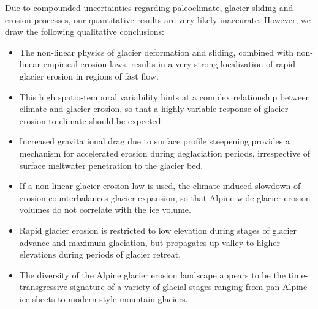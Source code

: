 \documentclass[esurf, manuscript]{copernicus}
\begin{document}
    Due to compounded uncertainties regarding paleoclimate, glacier sliding and
    erosion processes, our quantitative results are very likely inaccurate.
    However, we draw the following qualitative conclusions:
    \begin{itemize}
      \item The non-linear physics of glacier deformation and sliding, combined
        with non-linear empirical erosion laws, results in a very strong
        localization of rapid glacier erosion in regions of fast flow.
      \item This high spatio-temporal variability hints at a complex
        relationship between climate and glacier erosion, so that a highly
        variable response of glacier erosion to climate should be expected.
      \item Increased gravitational drag due to surface profile steepening
        provides a mechanism
        for accelerated erosion during deglaciation periods, irrespective of
        surface meltwater penetration to the glacier bed.
      \item If a non-linear glacier erosion law is used, the climate-induced
        slowdown of erosion counterbalances glacier expansion, so that
        Alpine-wide glacier erosion volumes do not correlate with the ice volume.
      \item Rapid glacier erosion is restricted to low elevation during stages
        of glacier advance and maximum glaciation, but propagates up-valley to
        higher elevations during periods of glacier retreat.
      \item The diversity of the Alpine glacier erosion landscape appears to
        be the time-transgressive signature of a variety of glacial stages
        ranging from pan-Alpine ice sheets to modern-style mountain glaciers.
    \end{itemize}



\end{document}
